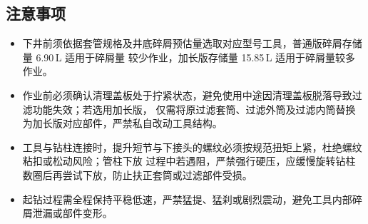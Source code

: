 \subsection{注意事项}

\begin{itemize}
	\item 下井前须依据套管规格及井底碎屑预估量选取对应型号工具，普通版碎屑存储量 6.90\,L 适用于碎屑量
	较少作业，加长版存储量 15.85\,L 适用于碎屑量较多作业。
	\item 作业前必须确认清理盖板处于拧紧状态，避免使用中途因清理盖板脱落导致过滤功能失效；若选用加长版，
	仅需将原过滤套筒、过滤外筒及过滤内筒替换为加长版对应部件，严禁私自改动工具结构。
	\item 工具与钻柱连接时，提升短节与下接头的螺纹必须按规范扭矩上紧，杜绝螺纹粘扣或松动风险；管柱下放
	过程中若遇阻，严禁强行硬压，应缓慢旋转钻柱数圈后再尝试下放，防止扶正套筒或过滤部件受损。
	\item 起钻过程需全程保持平稳低速，严禁猛提、猛刹或剧烈震动，避免工具内部碎屑泄漏或部件变形。
\end{itemize}

